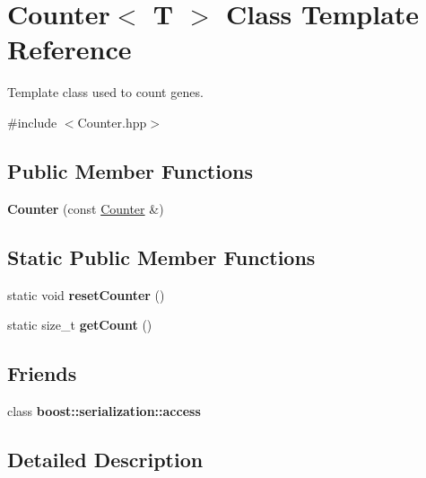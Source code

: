 \hypertarget{classCounter}{}\section{Counter$<$ T $>$ Class Template Reference}
\label{classCounter}


Template class used to count genes.  




{\ttfamily \#include $<$Counter.\+hpp$>$}

\subsection*{Public Member Functions}
\begin{DoxyCompactItemize}
\item 
{\bfseries Counter} (const \hyperlink{classCounter}{Counter} \&)\hypertarget{classCounter_afac9729d47e6842c8ff4d6bc03351c34}{}\label{classCounter_afac9729d47e6842c8ff4d6bc03351c34}

\end{DoxyCompactItemize}
\subsection*{Static Public Member Functions}
\begin{DoxyCompactItemize}
\item 
static void {\bfseries reset\+Counter} ()\hypertarget{classCounter_a8362ce0f5179d619d2e889c0770d340a}{}\label{classCounter_a8362ce0f5179d619d2e889c0770d340a}

\item 
static size\+\_\+t {\bfseries get\+Count} ()\hypertarget{classCounter_ac06581d7488fbf32850c29815cfdaadc}{}\label{classCounter_ac06581d7488fbf32850c29815cfdaadc}

\end{DoxyCompactItemize}
\subsection*{Friends}
\begin{DoxyCompactItemize}
\item 
class {\bfseries boost\+::serialization\+::access}\hypertarget{classCounter_ac98d07dd8f7b70e16ccb9a01abf56b9c}{}\label{classCounter_ac98d07dd8f7b70e16ccb9a01abf56b9c}

\end{DoxyCompactItemize}


\subsection{Detailed Description}
